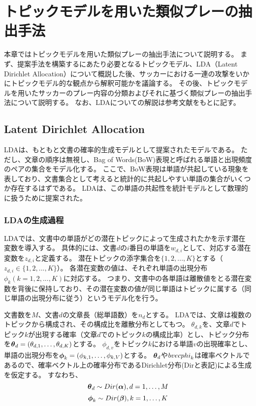 \section{トピックモデルを用いた類似プレーの抽出手法}
\label{sec:lda}
本章ではトピックモデルを用いた類似プレーの抽出手法について説明する。
まず、提案手法を構築するにあたり必要となるトピックモデル、LDA（Latent Dirichlet Allocation）について概説した後、サッカーにおける一連の攻撃をいかにトピックモデル的な観点から解釈可能かを議論する。
その後、トピックモデルを用いたサッカーのプレー内容の分類およびそれに基づく類似プレーの抽出手法について説明する。
なお、LDAについての解説は参考文献\cite{lda}\cite{topic_blue}\cite{topic_white}をもとに記す。

\subsection{Latent Dirichlet Allocation}
LDAは、もともと文書の確率的生成モデルとして提案されたモデルである。
ただし、文章の順序は無視し、Bag of Words(BoW)表現と呼ばれる単語と出現頻度のペアの集合をモデル化する。
ここで、BoW表現は単語が共起している現象を表しており、文書集合として考えると統計的に共起しやすい単語の集合がいくつか存在するはずである。
LDAは、この単語の共起性を統計モデルとして数理的に扱うために提案された。


\subsubsection{LDAの生成過程}
LDAでは、文書中の単語がどの潜在トピックによって生成されたかを示す潜在変数を導入する。
具体的には、文書$d$の$i$番目の単語を$w_{d,i}$として、対応する潜在変数を$z_{d,i}$と定義する。
潜在トピックの添字集合を$\{1,2,...,K\}$とする（$z_{d,i}\in\{1,2,...,K\}$）。
各潜在変数の値は、それぞれ単語の出現分布$\phi_k(k=1,2,...,K)$に対応する。
つまり、文書中の各単語は離散値をとる潜在変数を背後に保持しており、その潜在変数の値が同じ単語はトピックに属する（同じ単語の出現分布に従う）というモデル化を行う。

文書数を$M$、文書$d$の文章長（総単語数）を$n_d$とする。
LDAでは、文章は複数のトピックから構成され、その構成比を離散分布としてもつ。
$\theta_{d,k}$を、文章$d$でトピック$k$が出現する確率（文章$d$でのトピック$k$の構成比率）とし、トピック分布を$\mbox{\boldmath $\theta$}_d=(\theta_{d,1},\ldots,\theta_{d,K})$とする。
$\phi_{d,v}$をトピック$k$における単語$v$の出現確率とし、単語の出現分布を$\mbox{\boldmath $\phi$}_k=(\phi_{k,1},\ldots,\phi_{k,V})$とする。
$\mbox{\boldmath $\theta$}_d$や$\\bvec{phi}_k$は確率ベクトルであるので、確率ベクトル上の確率分布であるDirichlet分布(Dirと表記)による生成を仮定する。
すなわち、
\begin{equation}
	\mbox{\boldmath $\theta$}_d \sim Dir(\mbox{\boldmath $\alpha$}), d=1,\ldots,M
\end{equation}
\begin{equation}
	\mbox{\boldmath $\phi$}_k \sim Dir(\mbox{\boldmath $\beta$}), k=1,\ldots,K
\end{equation}

